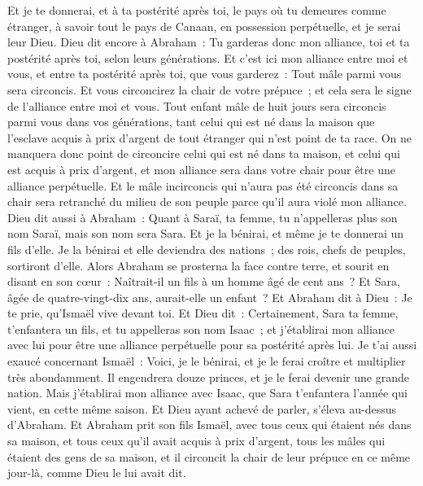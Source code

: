 \begin{multicols}{2}
Et je te donnerai, et à ta postérité après toi, le pays où tu demeures comme étranger, à savoir tout le pays de Canaan, en possession perpétuelle, et je serai leur Dieu.
Dieu dit encore à Abraham~: Tu garderas donc mon alliance, toi et ta postérité après toi, selon leurs générations.
Et c'est ici mon alliance entre moi et vous, et entre ta postérité après toi, que vous garderez~: Tout mâle parmi vous sera circoncis.
Et vous circoncirez la chair de votre prépuce~; et cela sera le signe de l'alliance entre moi et vous.
Tout enfant mâle de huit jours sera circoncis parmi vous dans vos générations, tant celui qui est né dans la maison que l'esclave acquis à prix d'argent de tout étranger qui n'est point de ta race.
On ne manquera donc point de circoncire celui qui est né dans ta maison, et celui qui est acquis à prix d'argent, et mon alliance sera dans votre chair pour être une alliance perpétuelle.
Et le mâle incirconcis qui n'aura pas été circoncis dans sa chair sera retranché du milieu de son peuple parce qu'il aura violé mon alliance.
Dieu dit aussi à Abraham~: Quant à Saraï, ta femme, tu n'appelleras plus son nom Saraï, mais son nom sera Sara.
Et je la bénirai, et même je te donnerai un fils d'elle. Je la bénirai et elle deviendra des nations~; des rois, chefs de peuples, sortiront d'elle.
Alors Abraham se prosterna la face contre terre, et sourit en disant en son cœur~: Naîtrait-il un fils à un homme âgé de cent ans~? Et Sara, âgée de quatre-vingt-dix ans, aurait-elle un enfant~?
Et Abraham dit à Dieu~: Je te prie, qu'Ismaël vive devant toi.
Et Dieu dit~: Certainement, Sara ta femme, t'enfantera un fils, et tu appelleras son nom Isaac~; et j'établirai mon alliance avec lui pour être une alliance perpétuelle pour sa postérité après lui.
Je t'ai aussi exaucé concernant Ismaël~: Voici, je le bénirai, et je le ferai croître et multiplier très abondamment. Il engendrera douze princes, et je le ferai devenir une grande nation.
Mais j'établirai mon alliance avec Isaac, que Sara t'enfantera l'année qui vient, en cette même saison.
Et Dieu ayant achevé de parler, s'éleva au-dessus d'Abraham.
Et Abraham prit son fils Ismaël, avec tous ceux qui étaient nés dans sa maison, et tous ceux qu'il avait acquis à prix d'argent, tous les mâles qui étaient des gens de sa maison, et il circoncit la chair de leur prépuce en ce même jour-là, comme Dieu le lui avait dit.

\end{multicols}
